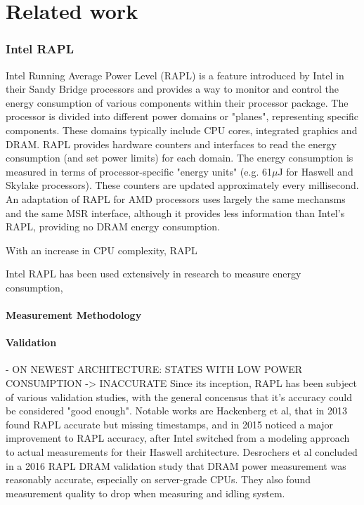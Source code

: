 \chapter{Related work} %
\label{Chapter2}

\subsection{Intel RAPL}

Intel Running Average Power Level (RAPL) is a feature introduced by Intel in their Sandy Bridge processors and provides a way to monitor and control the energy consumption of various components within their processor package\parencite{projectexigence_rapl}. The processor is divided into different power domains or "planes", representing specific components. These domains typically include CPU cores, integrated graphics and DRAM. RAPL provides hardware counters  and interfaces to read the energy consumption (and set power limits) for each domain. The energy consumption is measured in terms of processor-specific "energy units" (e.g. 61$\mu$J for Haswell and Skylake processors). These counters are updated approximately every millisecond. An adaptation of RAPL for AMD processors uses largely the same mechansms and the same MSR interface\parencite{amd_energy}, although it provides less information than Intel's RAPL\parencite{schone2021energy}, providing no DRAM energy consumption.

With an increase in CPU complexity, RAPL

Intel RAPL has been used extensively in research to measure energy consumption, 

\subsubsection{Measurement Methodology}
\parencite{schone2024energy}

\subsubsection{Validation}
- ON NEWEST ARCHITECTURE: STATES WITH LOW POWER CONSUMPTION -> INACCURATE \parencite{schone2024energy}
Since its inception, RAPL has been subject of various validation studies, with the general concensus that it's accuracy could be considered "good enough"\parencite{raffin2024dissecting}. Notable works are Hackenberg et al, that in 2013 found RAPL accurate but missing timestamps\parencite{hackenberg2013power}, and in 2015 noticed a major improvement to RAPL accuracy, after Intel switched from a modeling approach to actual measurements for their Haswell architecture\parencite{hackenberg2015energy}. Desrochers et al concluded in a 2016 RAPL DRAM validation study\parencite{desrochers2016validation} that DRAM power measurement was reasonably accurate, especially on server-grade CPUs. They also found measurement quality to drop when measuring and idling system.

